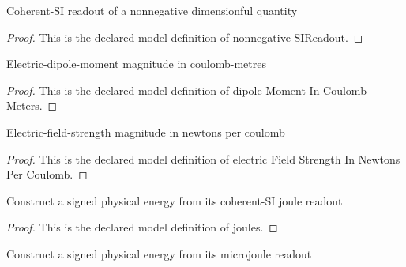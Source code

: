 \begin{definition}
  \label{def:physics:phyx-mini-0856:phyxminiproblems-problemphyxmini0856-nonnegativesireadout}
  Coherent-SI readout of a nonnegative dimensionful quantity
\end{definition}
\begin{proof}
  This is the declared model definition of nonnegative SIReadout.
\end{proof}
\begin{definition}
  \label{def:physics:phyx-mini-0856:phyxminiproblems-problemphyxmini0856-dipolemomentincoulombmeters}
  Electric-dipole-moment magnitude in coulomb-metres
\end{definition}
\begin{proof}
  This is the declared model definition of dipole Moment In Coulomb Meters.
\end{proof}
\begin{definition}
  \label{def:physics:phyx-mini-0856:phyxminiproblems-problemphyxmini0856-electricfieldstrengthinnewtonspercoulomb}
  Electric-field-strength magnitude in newtons per coulomb
\end{definition}
\begin{proof}
  This is the declared model definition of electric Field Strength In Newtons Per Coulomb.
\end{proof}
\begin{definition}[joules]
  \label{def:physics:phyx-mini-0856:phyxminiproblems-problemphyxmini0856-joules}
  Construct a signed physical energy from its coherent-SI joule readout
\end{definition}
\begin{proof}
  This is the declared model definition of joules.
\end{proof}
\begin{definition}[microjoules]
  \label{def:physics:phyx-mini-0856:phyxminiproblems-problemphyxmini0856-microjoules}
  Construct a signed physical energy from its microjoule readout
\end{definition}
